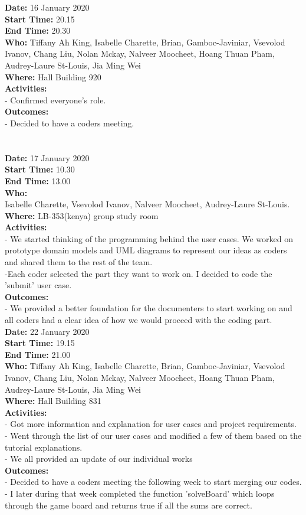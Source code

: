 \documentclass[12pt]{article}
\begin{document}
{\bf Date:} 16 January 2020 \\
{\bf Start Time:} 20.15 \\
{\bf End Time:} 20.30 \\
{\bf Who:} Tiffany Ah King, Isabelle Charette, Brian, Gamboc-Javiniar, Vsevolod Ivanov, Chang Liu, Nolan Mckay, Nalveer Moocheet, Hoang Thuan Pham, Audrey-Laure St-Louis, Jia Ming Wei \\
{\bf Where:} Hall Building 920 \\
{\bf Activities:}\\
- Confirmed everyone's role.\\ 
{\bf Outcomes:}\\
- Decided to have a coders meeting.
\\
\\
\\
{\bf Date:} 17 January 2020 \\
{\bf Start Time:} 10.30 \\
{\bf End Time:} 13.00 \\
{\bf Who:}\\ Isabelle Charette, Vsevolod Ivanov, Nalveer Moocheet, Audrey-Laure St-Louis. \\
{\bf Where:} LB-353(kenya) group study room \\
{\bf Activities:}\\
- We started thinking of the programming behind the user cases. We worked on prototype domain models and UML diagrams to represent our ideas as coders and shared them to the rest of the team.\\
-Each coder selected the part they want to work on. I decided to code the 'submit' user case.\\
{\bf Outcomes:}\\
- We provided a better foundation for the documenters to start working on and all coders had a clear idea of how we would proceed with the coding part.\\


{\bf Date:} 22 January 2020 \\
{\bf Start Time:} 19.15 \\
{\bf End Time:} 21.00 \\
{\bf Who:} Tiffany Ah King, Isabelle Charette, Brian, Gamboc-Javiniar, Vsevolod Ivanov, Chang Liu, Nolan Mckay, Nalveer Moocheet, Hoang Thuan Pham, Audrey-Laure St-Louis, Jia Ming Wei \\
{\bf Where:} Hall Building 831 \\
{\bf Activities:}\\
- Got more information and explanation for user cases and project requirements.\\
- Went through the list of our user cases and modified a few of them based on the tutorial explanations.\\
- We all provided an update of our individual works\\
{\bf Outcomes:}\\
- Decided to have a coders meeting the following week to start merging our codes.\\
- I later during that week completed the function 'solveBoard' which loops through the game board and returns true if all the sums are correct.\\
\end{document}
